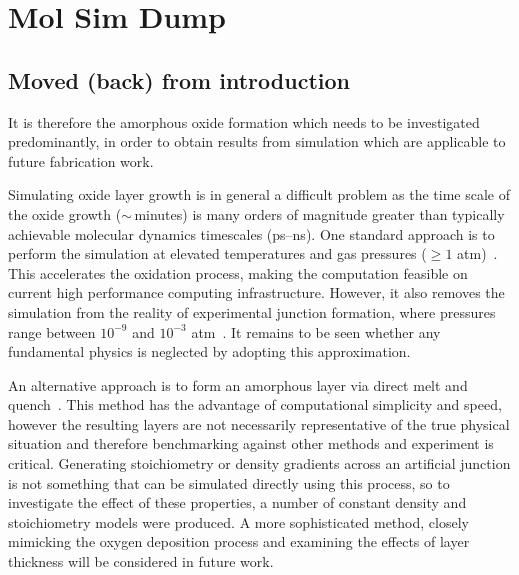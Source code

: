 \section{Mol Sim Dump}

\subsection{Moved (back) from introduction}
It is therefore the amorphous oxide formation which needs to be investigated predominantly, in order to obtain results from simulation which are applicable to future fabrication work.

Simulating oxide layer growth is in general a difficult problem as the time scale of the oxide growth ($\sim\,$minutes) is many orders of magnitude greater than typically achievable molecular dynamics timescales (ps--ns).
One standard approach is to perform the simulation at elevated temperatures and gas pressures ($\ge 1$ atm)~\cite{Campbell1999, Zhou2005, Hasnaoui2005}.
This accelerates the oxidation process, making the computation feasible on current high performance computing infrastructure.
However, it also removes the simulation from the reality of experimental junction formation, where pressures range between $10^{-9}$ and $10^{-3}$ atm~\cite{Morohashi1987, Kohlstedt1993, Jeurgens2002}.
It remains to be seen whether any fundamental physics is neglected by adopting this approximation.

An alternative approach is to form an amorphous layer via direct melt and quench~\cite{Vashishta2008,Sheng2012}.
This method has the advantage of computational simplicity and speed, however the resulting layers are not necessarily representative of the true physical situation and therefore benchmarking against other methods and experiment is critical.
Generating stoichiometry or density gradients across an artificial junction is not something that can be simulated directly using this process, so to investigate the effect of these properties, a number of constant density and stoichiometry models were produced. A more sophisticated method, closely mimicking the oxygen deposition process and examining the effects of layer thickness will be considered in future work.

